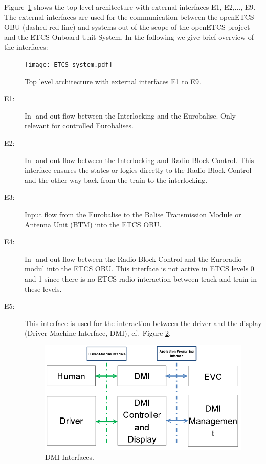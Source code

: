 Figure~\ref{f:top_level} shows the top level architecture with external interfaces E1, E2,$\ldots$, E9. The external interfaces are used for the communication between the openETCS OBU (dashed red line) and systems out of the scope of the openETCS project and the ETCS Onboard Unit System. In the following we give  brief overview of the interfaces:
\begin{figure}
\centering
\texttt{[image: ETCS\_system.pdf]}
\caption{Top level architecture with external interfaces E1 to E9.}
\label{f:top_level}
\end{figure}

\begin{description}
\item[E1:] In- and out flow between the Interlocking and the Eurobalise. Only relevant for controlled Eurobalises.

\item[E2:] In- and out flow between the Interlocking and Radio Block Control.
This interface ensures the states or logics directly to the Radio Block Control and the other way back from the train to the interlocking.

\item[E3:] Input flow from the Eurobalise to the Balise Transmission Module or Antenna Unit (BTM) into the ETCS OBU.

\item[E4:] In- and out flow between the Radio Block Control and the Euroradio modul into the ETCS OBU. This interface is not active in ETCS levels 0 and 1 since there is no ETCS radio interaction between track and train in these levels.

\item[E5:] This interface is used for the interaction between the driver and the display (Driver Machine Interface, DMI), cf.~Figure \ref{DMI Interfaces}.
\begin{figure}
\centering
\includegraphics[scale=0.5]{images/DMIinterfaces}
\caption{DMI Interfaces.}
\label{DMI Interfaces}
\end{figure}


\end{description}
